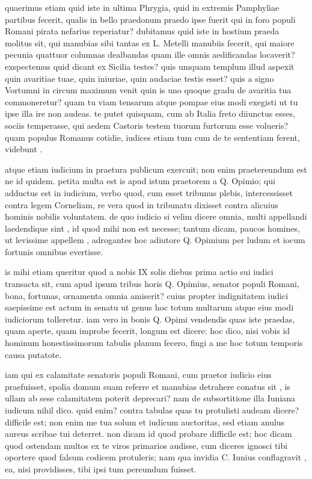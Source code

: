  quaerimus etiam quid iste in ultima Phrygia, quid in extremis Pamphyliae partibus fecerit, qualis in bello praedonum praedo ipse fuerit qui in foro populi Romani pirata nefarius reperiatur? dubitamus quid iste in hostium praeda molitus sit, qui manubias sibi tantas ex L. Metelli manubiis fecerit, qui maiore pecunia quattuor columnas dealbandas quam ille omnis aedificandas locaverit? exspectemus quid dicant ex Sicilia testes? quis umquam templum illud aspexit quin avaritiae tuae, quin iniuriae, quin audaciae testis esset? quis a signo Vortumni in circum maximum venit quin is uno quoque gradu de avaritia tua commoneretur? quam tu viam tensarum atque pompae eius modi exegisti ut tu ipse illa ire non audeas. te putet quisquam, cum ab Italia freto diiunctus esses, sociis temperasse, qui aedem Castoris testem tuorum furtorum esse volueris? quam populus Romanus cotidie, iudices etiam tum cum de te sententiam ferent, videbunt .

 atque etiam iudicium in praetura publicum exercuit; non enim praetereundum est ne id quidem. petita multa est is apud istum praetorem a Q. Opimio; qui adductus est in iudicium, verbo quod, cum esset tribunus plebis, intercessisset contra legem Corneliam, re vera quod in tribunatu dixisset contra alicuius hominis nobilis voluntatem. de quo iudicio si velim dicere omnia, multi appellandi laedendique sint , id quod mihi non est necesse; tantum dicam, paucos homines, ut levissime appellem , adrogantes hoc adiutore Q. Opimium per ludum et iocum fortunis omnibus evertisse.

 is mihi etiam queritur quod a nobis IX solis diebus prima actio sui iudici transacta sit, cum apud ipsum tribus horis Q. Opimius, senator populi Romani, bona, fortunas, ornamenta omnia amiserit? cuius propter indignitatem iudici saepissime est actum in senatu ut genus hoc totum multarum atque eius modi iudiciorum tolleretur. iam vero in bonis Q. Opimi vendendis quas iste praedas, quam aperte, quam improbe fecerit, longum est dicere: hoc dico, nisi vobis id hominum honestissimorum tabulis planum fecero, fingi a me hoc totum temporis causa putatote.

 iam qui ex calamitate senatoris populi Romani, cum praetor iudicio eius praefuisset, spolia domum suam referre et manubias detrahere conatus sit , is ullam ab sese calamitatem poterit deprecari? nam de subsortitione illa Iuniana iudicum nihil dico. quid enim? contra tabulas quas tu protulisti audeam dicere? difficile est; non enim me tua solum et iudicum auctoritas, sed etiam anulus aureus scribae tui deterret. non dicam id quod probare difficile est; hoc dicam quod ostendam multos ex te viros primarios audisse, cum diceres ignosci tibi oportere quod falsum codicem protuleris; nam qua invidia C. Iunius conflagravit , ea, nisi providisses, tibi ipsi tum pereundum fuisset.

